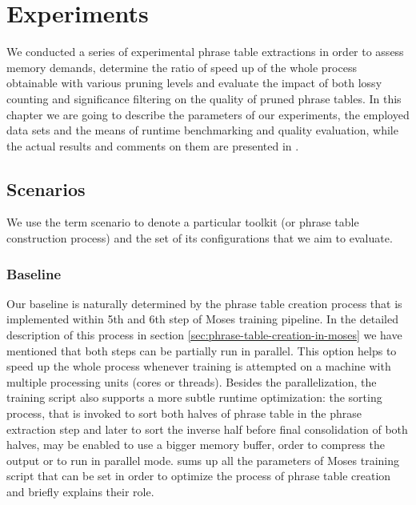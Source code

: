 \chapter{Experiments}
\label{chap:experiments}

We conducted a series of experimental phrase table extractions in order to
assess \eppex{} memory demands, determine the ratio of speed up of the whole
process obtainable with various pruning levels and evaluate the impact of both
lossy counting and significance filtering on the quality of pruned phrase tables.
In this chapter we are going to describe the parameters of our experiments,
the employed data sets and the means of runtime benchmarking and quality
evaluation, while the actual results and comments on them are presented in
.

\section{Scenarios}

We use the term scenario to denote a particular toolkit (or phrase table construction process)
and the set of its configurations that we aim to evaluate.

\subsection{Baseline}

Our baseline is naturally determined by the phrase table creation process
that is implemented within 5th and 6th step of Moses training pipeline.
In the detailed description of this process in section \ref{sec:phrase-table-creation-in-moses}
we have mentioned that both steps can be partially run in parallel.
This option helps to speed up the whole process whenever training is
attempted on a machine with multiple processing units (cores or threads).
Besides the parallelization, the training script also supports a more subtle
runtime optimization: the sorting process, that is invoked to sort both halves
of phrase table in the phrase extraction step and later to sort the inverse
half before final consolidation of both halves, may be enabled to use a bigger
memory buffer, order to compress the output or to run in parallel mode.
 sums up all the parameters of Moses
training script that can be set in order to optimize the process of phrase
table creation and briefly explains their role.

